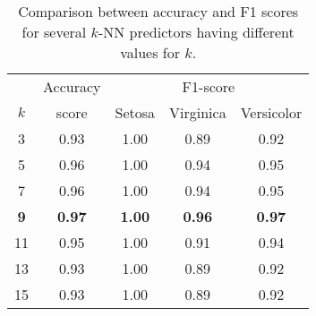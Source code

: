 
\begin{table}
	\caption{Comparison between accuracy and F1 scores for several $k$-NN predictors having different values for $k$.}
	\label{tab:predictor}
	\begin{tabular}{c|c|ccc}
		\toprule
		& Accuracy & \multicolumn{3}{c}{F1-score}\\
 		$k$ & score & Setosa & Virginica & Versicolor \\
		\midrule
		3 & 0.93 & 1.00 & 0.89 & 0.92 \\
		5 & 0.96 & 1.00 & 0.94 & 0.95 \\
		7 & 0.96 & 1.00 & 0.94 & 0.95 \\
		\textbf{9} & \textbf{0.97} & \textbf{1.00} & \textbf{0.96} & \textbf{0.97} \\
		11 & 0.95 & 1.00 & 0.91 & 0.94 \\
		13 & 0.93 & 1.00 & 0.89 & 0.92 \\
		15 & 0.93 & 1.00 & 0.89 & 0.92 \\
		\bottomrule
	\end{tabular}
\end{table}